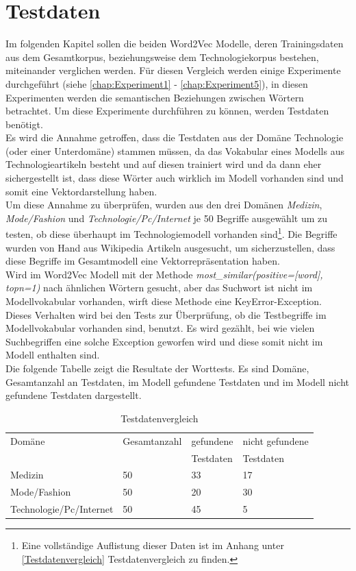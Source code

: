 \documentclass[12pt,a4paper]{report}
\begin{document}
	\section{Testdaten}
Im folgenden Kapitel sollen die beiden Word2Vec Modelle, deren Trainingsdaten aus dem Gesamtkorpus, beziehungsweise dem Technologiekorpus bestehen, miteinander verglichen werden. Für diesen Vergleich werden einige Experimente durchgeführt (siehe \ref{chap:Experiment1} - \ref{chap:Experiment5}), in diesen Experimenten werden die semantischen Beziehungen zwischen Wörtern betrachtet. Um diese Experimente durchführen zu können, werden Testdaten benötigt.\\
Es wird die Annahme getroffen, dass die Testdaten aus der Domäne Technologie (oder einer Unterdomäne) stammen müssen, da das Vokabular eines Modells aus Technologieartikeln besteht und auf diesen trainiert wird und da dann eher sichergestellt ist, dass diese Wörter auch wirklich im Modell vorhanden sind und somit eine Vektordarstellung haben.\\
Um diese Annahme zu überprüfen, wurden aus den drei Domänen \textit{Medizin}, \textit{Mode/Fashion} und \textit{Technologie/Pc/Internet} je 50 Begriffe ausgewählt um zu testen, ob diese überhaupt im Technologiemodell vorhanden sind\footnote{Eine vollständige Auflistung dieser Daten ist im Anhang unter \ref{Testdatenvergleich} Testdatenvergleich zu finden.}. Die Begriffe wurden von Hand aus Wikipedia Artikeln ausgesucht, um sicherzustellen, dass diese Begriffe im Gesamtmodell eine Vektorrepräsentation haben.\\
Wird im Word2Vec Modell mit der Methode \textit{most\_similar(positive=[\grq word\grq], topn=1)} nach ähnlichen Wörtern gesucht, aber das Suchwort ist nicht im Modellvokabular vorhanden, wirft diese Methode eine \glqq KeyError\grqq -Exception. Dieses Verhalten wird bei den Tests zur Überprüfung, ob die Testbegriffe im Modellvokabular vorhanden sind, benutzt. Es wird gezählt, bei wie vielen Suchbegriffen eine solche Exception geworfen wird und diese somit nicht im Modell enthalten sind.\\

Die folgende Tabelle zeigt die Resultate der Worttests. Es sind Domäne, Gesamtanzahl an Testdaten, im Modell gefundene Testdaten und im Modell nicht gefundene Testdaten dargestellt.

\begin{table}[H]
\caption{Testdatenvergleich}
\begin{center}
\begin{tabular}{|l||l|l|l|}
\hline
Domäne 	& Gesamtanzahl 	& gefundene & nicht gefundene \\
 		&  				& Testdaten	& Testdaten \\

\hline
 Medizin & 50 & 33 & 17\\
 \hline
 Mode/Fashion & 50 & 20 & 30\\
 \hline
 Technologie/Pc/Internet & 50 & 45 & 5\\
 \hline
 
\end{tabular}
\end{center}
\end{table}
\end{document}
